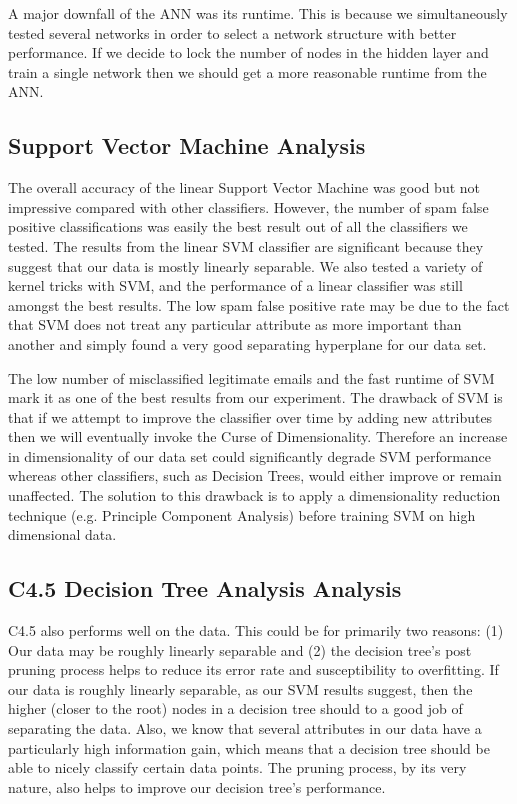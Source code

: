 \documentclass[11pt,oneside,reqno]{amsart}
\theoremstyle{definition}
\theoremstyle{definition}
\theoremstyle{remark}
\numberwithin{equation}{section}
\numberwithin{equation}{section}
\begin{document}
A major downfall of the ANN was its runtime. This is because we simultaneously tested several networks in order to select a network structure with better performance. If we decide to lock the number of nodes in the hidden layer and train a single network then we should get a more reasonable runtime from the ANN.

\subsection{Support Vector Machine Analysis}
The overall accuracy of the linear Support Vector Machine was good but not impressive compared with other classifiers. However, the number of spam false positive classifications was easily the best result out of all the classifiers we tested. The results from the linear SVM classifier are significant because they suggest that our data is mostly linearly separable. We also tested a variety of kernel tricks with SVM, and the performance of a linear classifier was still amongst the best results. The low spam false positive rate may be due to the fact that SVM does not treat any particular attribute as more important than another and simply found a very good separating hyperplane for our data set.

The low number of misclassified legitimate emails and the fast runtime of SVM mark it as one of the best results from our experiment. The drawback of SVM is that if we attempt to improve the classifier over time by adding new attributes then we will eventually invoke the Curse of Dimensionality. Therefore an increase in dimensionality of our data set could significantly degrade SVM performance whereas other classifiers, such as Decision Trees, would either improve or remain unaffected. The solution to this drawback is to apply a dimensionality reduction technique (e.g. Principle Component Analysis) before training SVM on high dimensional data.

\subsection{C4.5 Decision Tree Analysis Analysis}
C4.5 also performs well on the data. This could be for primarily two reasons: (1) Our data may be roughly linearly separable and (2) the decision tree's post pruning process helps to reduce its error rate and susceptibility to overfitting. If our data is roughly linearly separable, as our SVM results suggest, then the higher (closer to the root) nodes in a decision tree should to a good job of separating the data. Also, we know that several attributes in our data have a particularly high information gain, which means that a decision tree should be able to nicely classify certain data points. The pruning process, by its very nature, also helps to improve our decision tree's performance.
\end{document}
